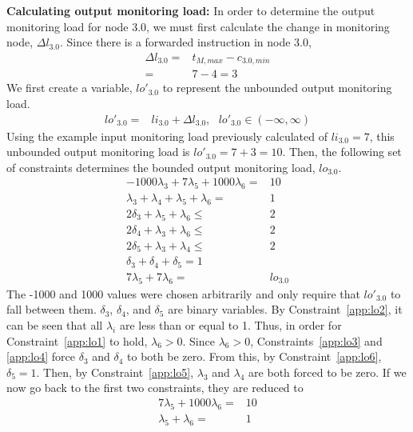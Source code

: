 {\bf Calculating output monitoring load:}
In order to determine the output monitoring load for node 3.0, we must first
calculate the change in monitoring node, $\Delta l_{3.0}$. Since there is a forwarded instruction in node 3.0,
\begin{align*}
  \Delta l_{3.0} =& t_{M, max} - c_{3.0, min} \\
  =& 7 - 4 = 3
\end{align*}
We first create a variable, $lo'_{3.0}$ to represent the unbounded output monitoring load.
\begin{align*}
  lo'_{3.0} =& li_{3.0} + \Delta l_{3.0}, \text{ } lo'_{3.0} \in (-\infty, \infty)
\end{align*}
Using the example input monitoring load previously calculated of $li_{3.0} =
7$, this unbounded output monitoring load is $lo'_{3.0} = 7 + 3 = 10$.
Then, the following set of constraints determines the bounded output monitoring load, $lo_{3.0}$.
\begin{subequations}
\begin{align}
  -1000\lambda_3 + 7\lambda_5 + 1000\lambda_6 =& 10 \label{app:lo1}\\ 
  \lambda_3 + \lambda_4 + \lambda_5 + \lambda_6 =& 1 \label{app:lo2}\\
  2 \delta_3 + \lambda_5 + \lambda_6 \leq& 2 \label{app:lo3}\\
  2 \delta_4 + \lambda_3 + \lambda_6 \leq& 2 \label{app:lo4}\\
  2 \delta_5 + \lambda_3 + \lambda_4 \leq& 2 \label{app:lo5}\\
  \delta_3 + \delta_4 + \delta_5 = 1 \label{app:lo6}\\
  7\lambda_5 + 7\lambda_6 =& lo_{3.0} \label{app:lo7}
\end{align}
\end{subequations}
The -1000 and 1000 values were chosen arbitrarily and only require that
$lo'_{3.0}$ to fall between them. $\delta_3$, $\delta_4$, and $\delta_5$ are binary variables. By Constraint~\ref{app:lo2}, it can be seen that
all $\lambda_i$ are less than or equal to 1. Thus, in order for 
Constraint~\ref{app:lo1} to hold, $\lambda_6 >  0$. Since $\lambda_6 > 0$, Constraints~\ref{app:lo3} and
\ref{app:lo4} force $\delta_3$ and $\delta_4$ to both be zero. From this, by Constraint~\ref{app:lo6},
$\delta_5 = 1$. Then, by Constraint~\ref{app:lo5}, $\lambda_3$ and $\lambda_4$ are both
forced to be zero. If we now go back to the first two constraints, they are
reduced to
\begin{align*}
  7\lambda_5 + 1000\lambda_6 =& 10\\
  \lambda_5 + \lambda_6 =& 1 \\
\end{align*}
